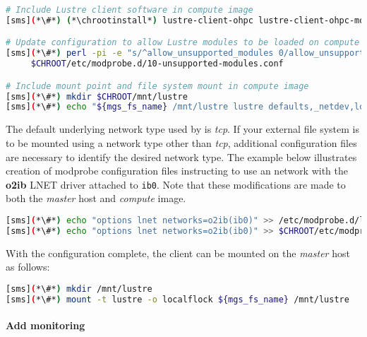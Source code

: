 \documentclass[letterpaper]{article}
\newcommand{\chrootinstall}{zypper -n --root \$CHROOT install}
\begin{document}
\begin{lstlisting}[language=bash,keywords={},upquote=true]
# Include Lustre client software in compute image
[sms](*\#*) (*\chrootinstall*) lustre-client-ohpc lustre-client-ohpc-modules

# Update configuration to allow Lustre modules to be loaded on compute hosts
[sms](*\#*) perl -pi -e "s/^allow_unsupported_modules 0/allow_unsupported_modules 1/" \
     $CHROOT/etc/modprobe.d/10-unsupported-modules.conf

# Include mount point and file system mount in compute image
[sms](*\#*) mkdir $CHROOT/mnt/lustre
[sms](*\#*) echo "${mgs_fs_name} /mnt/lustre lustre defaults,_netdev,localflock 0 0" >> $CHROOT/etc/fstab
\end{lstlisting}

The default underlying network type used by \Lustre{} is {\em tcp}. If your
external \Lustre{} file system is to be mounted using a network type other than
{\em tcp}, additional configuration files are necessary to identify the desired
network type. The example below illustrates creation of modprobe configuration files
instructing \Lustre{} to use an \InfiniBand{} network with the \textbf{o2ib} LNET driver
attached to \texttt{ib0}. Note that these modifications are made to both the
{\em master} host and {\em compute} image.

\begin{lstlisting}[language=bash,keywords={},upquote=true]
[sms](*\#*) echo "options lnet networks=o2ib(ib0)" >> /etc/modprobe.d/lustre.conf
[sms](*\#*) echo "options lnet networks=o2ib(ib0)" >> $CHROOT/etc/modprobe.d/lustre.conf
\end{lstlisting}

With the \Lustre{} configuration complete, the client can be mounted on the {\em master}
host as follows:
\begin{lstlisting}[language=bash,keywords={},upquote=true]
[sms](*\#*) mkdir /mnt/lustre
[sms](*\#*) mount -t lustre -o localflock ${mgs_fs_name} /mnt/lustre
\end{lstlisting}

\clearpage
\paragraph{Add \Nagios{} monitoring}

\end{document}
